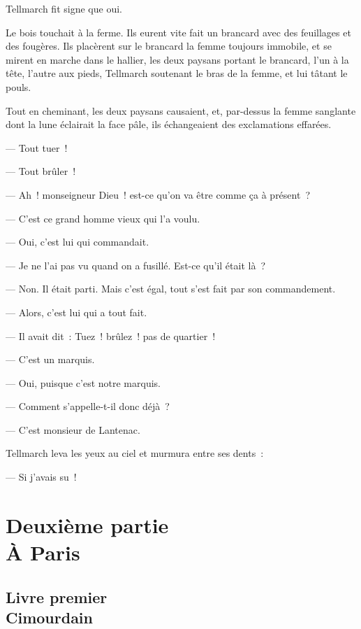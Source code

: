 \documentclass[french,twoside]{book} %
\begin{document}
Tellmarch fit signe que oui.\par
Le bois touchait à la ferme. Ils eurent vite fait un brancard avec des feuillages et des fougères. Ils placèrent sur le brancard la femme toujours immobile, et se mirent en marche dans le hallier, les deux paysans portant le brancard, l’un à la tête, l’autre aux pieds, Tellmarch soutenant le bras de la femme, et lui tâtant le pouls.\par
Tout en cheminant, les deux paysans causaient, et, par-dessus la femme sanglante dont la lune éclairait la face pâle, ils échangeaient des exclamations effarées.\par
— Tout tuer !\par
— Tout brûler !\par
— Ah ! monseigneur Dieu ! est-ce qu’on va être comme ça à présent ?\par
— C’est ce grand homme vieux qui l’a voulu.\par
— Oui, c’est lui qui commandait.\par
— Je ne l’ai pas vu quand on a fusillé. Est-ce qu’il était là ?\par
— Non. Il était parti. Mais c’est égal, tout s’est fait par son commandement.\par
 — Alors, c’est lui qui a tout fait.\par
— Il avait dit : Tuez ! brûlez ! pas de quartier !\par
— C’est un marquis.\par
— Oui, puisque c’est notre marquis.\par
— Comment s’appelle-t-il donc déjà ?\par
— C’est monsieur de Lantenac.\par
Tellmarch leva les yeux au ciel et murmura entre ses dents :\par
— Si j’avais su !
 
\hline
\section[{Deuxième partie. À Paris}]{Deuxième partie \\
À Paris}
\label{p2}\renewcommand{\leftmark}{Deuxième partie \\
À Paris}

  \subsection[{Livre premier. Cimourdain}]{Livre premier \\
Cimourdain}
\label{p2l1}
\end{document}
